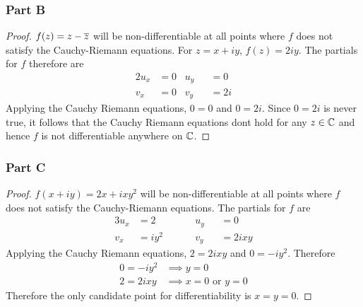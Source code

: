 \documentclass[12pt,titlepage]{extarticle}
\begin{document}
\subsubsection*{Part B}
\begin{proof}
    $f(z) = z - \overline{z}$ will be non-differentiable at all points where $f$ does not satisfy the Cauchy-Riemann equations. For $z = x + iy$, $f(z) = 2iy$. The partials for $f$ therefore are
    \begin{alignat*}{2}
        u_x &= 0 \;\;\; u_y &&= 0 \\
        v_x &= 0 \;\;\; v_y &&= 2i
    \end{alignat*}
    Applying the Cauchy Riemann equations, $0 = 0$ and $0 = 2i$. Since $0 = 2i$ is never true, it follows that the Cauchy Riemann equations dont hold for any $z \in \mathbb{C}$ and hence $f$ is not differentiable anywhere on $\mathbb{C}$.
\end{proof}

\subsubsection*{Part C}
\begin{proof}
    $f(x+iy) = 2x + ixy^2$ will be non-differentiable at all points where $f$ does not satisfy the Cauchy-Riemann equations. The partials for $f$ are
    \begin{alignat*}{3}
        u_x &= 2 \hspace{1cm} && u_y &&= 0 \\
        v_x &= iy^2 && v_y &&= 2ixy
    \end{alignat*}
    Applying the Cauchy Riemann equations, $2 = 2ixy$ and $0 = -iy^2$. Therefore
    \begin{align*}
        0 = -iy^2 &\implies y = 0 \\
        2 = 2ixy &\implies x = 0 \text{ or } y = 0
    \end{align*}
    Therefore the only candidate point for differentiability is $x = y = 0$.
\end{proof}
\end{document}
